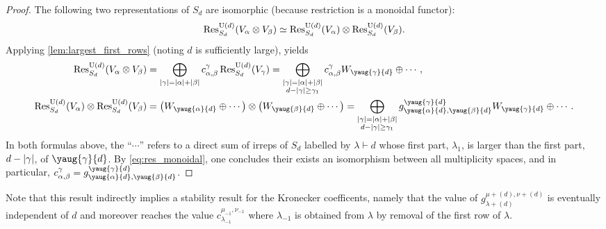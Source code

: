 \documentclass[notitlepage, 10pt]{article}
\begin{document}
\begin{proof}
    The following two representations of $S_d$ are isomorphic (because restriction is a monoidal functor):
    \begin{equation}
        \operatorname{Res}^{\operatorname{U}(d)}_{S_d}(V_{\alpha}\otimes V_{\beta}) \simeq \operatorname{Res}^{\operatorname{U}(d)}_{S_d}(V_{\alpha})\otimes \operatorname{Res}^{\operatorname{U}(d)}_{S_d}(V_{\beta}).
        \label{eq:res_monoidal}
    \end{equation}
    Applying \cref{lem:largest_first_rows} (noting $d$ is sufficiently large), yields
    \begin{align}
        \Res^{\U(d)}_{S_d}(V_{\alpha}\ot V_{\beta}) &= \bigoplus_{\abs{\gamma} = \abs{\alpha}+\abs{\beta}} c^{\gamma}_{\alpha,\beta} \Res^{\U(d)}_{S_d}(V_{\gamma}) = \bigoplus_{\substack{\abs{\gamma} = \abs{\alpha}+\abs{\beta}\\d-\abs{\gamma}\geq \gamma_1}} c^{\gamma}_{\alpha,\beta} W_{\yaug{\gamma}{d}} \oplus \cdots, \\
        \Res^{\U(d)}_{S_d}(V_{\alpha})\ot \Res^{\U(d)}_{S_d}(V_{\beta}) &= \left( W_{\yaug{\alpha}{d}} \oplus \cdots \right)\ot \left( W_{\yaug{\beta}{d}} \oplus \cdots \right) = \bigoplus_{\substack{\abs{\gamma} = \abs{\alpha}+\abs{\beta}\\d-\abs{\gamma}\geq \gamma_1}}g^{\yaug{\gamma}{d}}_{\yaug{\alpha}{d}, \yaug{\beta}{d}} W_{\yaug{\gamma}{d}} \oplus \cdots.
    \end{align}
    In both formulas above, the ``$\cdots$'' refers to a direct sum of irreps of $S_d$ labelled by $\lambda \vdash d$ whose first part, $\lambda_1$, is larger than the first part, $d-\left|\gamma\right|$, of $\yaug{\gamma}{d}$.
    By \cref{eq:res_monoidal}, one concludes their exists an isomorphism between all multiplicity spaces, and in particular, $c^{\gamma}_{\alpha, \beta} = g^{\yaug{\gamma}{d}}_{\yaug{\alpha}{d}, \yaug{\beta}{d}}$.
\end{proof}



\begin{rem}
    Note that this result indirectly implies a stability result for the Kronecker coefficents, namely that the value of $g_{\lambda + (d)}^{\mu + (d), \nu + (d)}$ is eventually independent of $d$ and moreover reaches the value $c_{\lambda_{-1}}^{\mu_{-1}, \nu_{-1}}$ where $\lambda_{-1}$ is obtained from $\lambda$ by removal of the first row of $\lambda$.
\end{rem}
\end{document}
